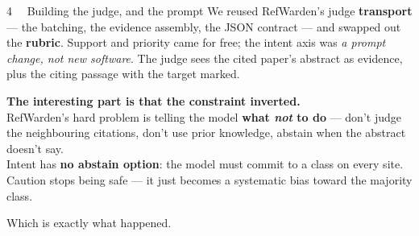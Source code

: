 \documentclass[final]{beamer}
\newcommand{\smallbody}{\fontsize{19}{24}\selectfont}
\newlength{\colw}
\begin{document}
\begin{frame}[t]{}
\begin{minipage}[t]{\colw}
\begin{pblock}{4 \ \ Building the judge, and the prompt}
We reused RefWarden's judge \textbf{transport} --- the batching, the evidence assembly, the
JSON contract --- and swapped out the \textbf{rubric}. Support and priority came for free;
the intent axis was \emph{a prompt change, not new software}. The judge sees the cited
paper's abstract as evidence, plus the citing passage with the target marked.

\begin{pnote}
\smallbody
\textbf{The interesting part is that the constraint inverted.}\\[6pt]
RefWarden's hard problem is telling the model \textbf{what \emph{not} to do} --- don't
judge the neighbouring citations, don't use prior knowledge, abstain when the abstract
doesn't say.\\[6pt]
Intent has \textbf{no abstain option}: the model must commit to a class on every site.
Caution stops being safe --- it just becomes a systematic bias toward the majority class.
\end{pnote}

\medskip
Which is exactly what happened.

\medskip
\begin{center}
\end{center}
\end{pblock}
\end{minipage}
\end{frame}
\end{document}
